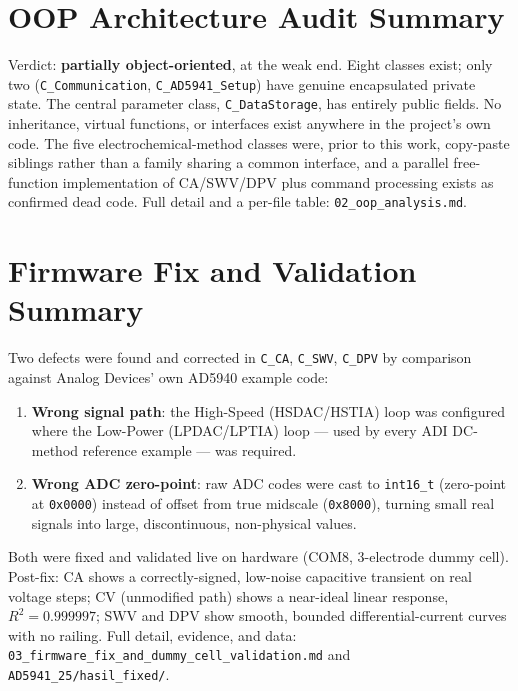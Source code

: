 \documentclass[journal]{IEEEtran}
\begin{document}
\section{OOP Architecture Audit Summary}
Verdict: \textbf{partially object-oriented}, at the weak end. Eight classes exist; only two (\texttt{C\_Communication}, \texttt{C\_AD5941\_Setup}) have genuine encapsulated private state. The central parameter class, \texttt{C\_DataStorage}, has entirely public fields. No inheritance, virtual functions, or interfaces exist anywhere in the project's own code. The five electrochemical-method classes were, prior to this work, copy-paste siblings rather than a family sharing a common interface, and a parallel free-function implementation of CA/SWV/DPV plus command processing exists as confirmed dead code. Full detail and a per-file table: \texttt{02\_oop\_analysis.md}.

\section{Firmware Fix and Validation Summary}
Two defects were found and corrected in \texttt{C\_CA}, \texttt{C\_SWV}, \texttt{C\_DPV} by comparison against Analog Devices' own AD5940 example code:
\begin{enumerate}
\item \textbf{Wrong signal path}: the High-Speed (HSDAC/HSTIA) loop was configured where the Low-Power (LPDAC/LPTIA) loop --- used by every ADI DC-method reference example --- was required.
\item \textbf{Wrong ADC zero-point}: raw ADC codes were cast to \texttt{int16\_t} (zero-point at \texttt{0x0000}) instead of offset from true midscale (\texttt{0x8000}), turning small real signals into large, discontinuous, non-physical values.
\end{enumerate}
Both were fixed and validated live on hardware (COM8, 3-electrode dummy cell). Post-fix: CA shows a correctly-signed, low-noise capacitive transient on real voltage steps; CV (unmodified path) shows a near-ideal linear response, $R^2=0.999997$; SWV and DPV show smooth, bounded differential-current curves with no railing. Full detail, evidence, and data: \texttt{03\_firmware\_fix\_and\_dummy\_cell\_validation.md} and \texttt{AD5941\_25/hasil\_fixed/}.
\end{document}
